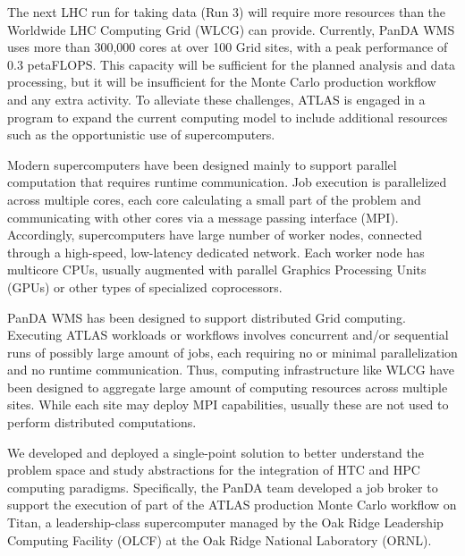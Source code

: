 The next LHC run for taking data (Run 3) will require more resources than the
Worldwide LHC Computing Grid (WLCG) can provide. Currently, PanDA WMS uses more
than
300,000 cores at over 100 Grid sites, with a peak performance of 0.3 petaFLOPS. This
capacity will be sufficient for the planned analysis and data processing, but it
will be insufficient for the Monte Carlo production workflow and any extra
activity. To alleviate these challenges, ATLAS is engaged in a program to expand
the current computing model to include additional resources such as the
opportunistic use of supercomputers.


Modern supercomputers have been designed mainly to support parallel computation
that requires runtime communication. Job execution is parallelized across
multiple cores, each core calculating a small part of the problem and
communicating with other cores via a message passing interface (MPI).
Accordingly, supercomputers have large number of worker nodes, connected through
a high-speed, low-latency dedicated network. Each worker node has multicore
CPUs, usually augmented with parallel Graphics Processing Units (GPUs) or other
types of specialized coprocessors.


PanDA WMS has been designed to support distributed Grid computing. Executing
ATLAS workloads or workflows involves concurrent and/or sequential runs of
possibly large amount of jobs, each requiring no or minimal parallelization and
no runtime communication. Thus, computing infrastructure like WLCG have been
designed to aggregate large amount of computing resources across multiple sites.
While each site may deploy MPI capabilities, usually these are not used to
perform distributed computations.

We developed and deployed a single-point solution to better understand the
problem space and study abstractions for the integration of HTC and HPC
computing paradigms. Specifically, the PanDA team developed a job broker to
support the execution of part of the ATLAS production Monte Carlo workflow on
Titan, a leadership-class supercomputer managed by the Oak Ridge Leadership
Computing Facility (OLCF) at the Oak Ridge National Laboratory (ORNL).

